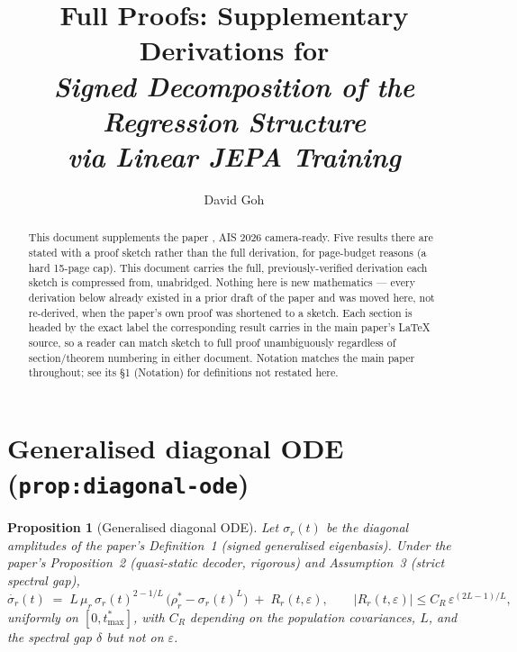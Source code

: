 \documentclass[11pt]{article}
\title{Full Proofs: Supplementary Derivations for\\
  \emph{Signed Decomposition of the Regression Structure\\
  via Linear JEPA Training}}
\author{David Goh}
\date{}
\newcommand{\eps}{\varepsilon}
\newcommand{\rhostar}{\rho_r^*}
\newcommand{\sigmar}{\sigma_r}
\theoremstyle{plain}
\newtheorem{proposition}[theorem]{Proposition}
\theoremstyle{definition}
\theoremstyle{remark}
\begin{document}
\maketitle

\begin{abstract}
This document supplements the paper \citep{Goh2026signed}, AIS 2026 camera-ready.
Five results there are stated with a proof sketch rather than the full derivation,
for page-budget reasons (a hard 15-page cap). This document carries the full,
previously-verified derivation each sketch is compressed from, unabridged. Nothing
here is new mathematics — every derivation below already existed in a prior draft
of the paper and was moved here, not re-derived, when the paper's own proof was
shortened to a sketch. Each section is headed by the exact label the corresponding
result carries in the main paper's \LaTeX{} source, so a reader can match sketch to
full proof unambiguously regardless of section/theorem numbering in either document.
Notation matches the main paper throughout; see its \S1 (Notation) for definitions
not restated here.
\end{abstract}

\tableofcontents

\section{Generalised diagonal ODE (\texttt{prop:diagonal-ode})}
\label{sec:diagonal-ode}

\begin{proposition}[Generalised diagonal ODE]
Let $\sigmar(t)$ be the diagonal amplitudes of the paper's Definition~1
(signed generalised eigenbasis). Under the paper's Proposition~2
(quasi-static decoder, rigorous) and Assumption~3 (strict spectral gap),
\begin{equation}
\label{eq:diagonal-ode}
\dot{\sigmar}(t)
\;=\;
L\,\mu_r\,\sigmar(t)^{2-1/L}\,\big(\rhostar - \sigmar(t)^L\big)
\;+\;
R_r(t, \eps),
\qquad
|R_r(t, \eps)| \le C_R\,\eps^{(2L-1)/L},
\end{equation}
uniformly on $[0, t_{\max}^*]$, with $C_R$ depending on the population
covariances, $L$, and the spectral gap $\delta$ but not on $\eps$.
\end{proposition}
\end{document}
